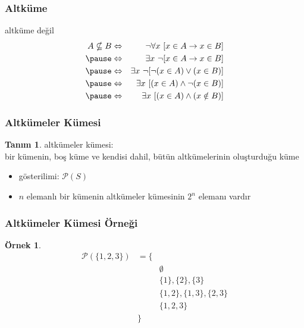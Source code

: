 \documentclass[dvipsnames]{beamer}
\theoremstyle{definition}
\newtheorem{tanim}[theorem]{Tanım}
\theoremstyle{example}
\newtheorem{ornek}[theorem]{Örnek}
\theoremstyle{plain}
\begin{document}
\begin{frame}
  \frametitle{Altküme}

  \begin{block}{altküme değil}
    \begin{eqnarray*}
      A \nsubseteq B & \Leftrightarrow
                     & \neg \forall x~[x \in A \rightarrow x \in B]\\\pause
                     & \Leftrightarrow
                     & \exists x~\neg [x \in A \rightarrow x \in B]\\\pause
                     & \Leftrightarrow
                     & \exists x~\neg [\neg (x \in A) \vee (x \in B)]\\\pause
                     & \Leftrightarrow
                     & \exists x~[(x \in A) \wedge \neg (x \in B)]\\\pause
                     & \Leftrightarrow
                     & \exists x~[(x \in A) \wedge (x \notin B)]
    \end{eqnarray*}
  \end{block}
\end{frame}

\begin{frame}
  \frametitle{Altkümeler Kümesi}

  \begin{tanim}
    \alert{altkümeler kümesi}:\\
      bir kümenin, boş küme ve kendisi dahil, bütün altkümelerinin oluşturduğu
      küme

    \begin{itemize}
      \item gösterilimi: $\mathcal{P}(S)$
    \end{itemize}
  \end{tanim}

  \pause
  \begin{itemize}
    \item $n$ elemanlı bir kümenin altkümeler kümesinin $2^n$ elemanı vardır
  \end{itemize}
\end{frame}

\begin{frame}
  \frametitle{Altkümeler Kümesi Örneği}

  \begin{ornek}
    \begin{eqnarray*}
      \mathcal{P}(\{1,2,3\}) & = \{ &\\
                             &      & \emptyset\\
                             &      & \{1\},\{2\},\{3\}\\
                             &      & \{1,2\},\{1,3\},\{2,3\}\\
                             &      & \{1,2,3\}\\
                             &   \} &
    \end{eqnarray*}
  \end{ornek}
\end{frame}
\end{document}
